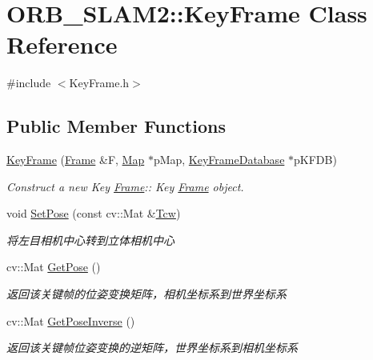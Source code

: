 \hypertarget{class_o_r_b___s_l_a_m2_1_1_key_frame}{}\section{O\+R\+B\+\_\+\+S\+L\+A\+M2\+:\+:Key\+Frame Class Reference}
\label{class_o_r_b___s_l_a_m2_1_1_key_frame}


{\ttfamily \#include $<$Key\+Frame.\+h$>$}

\subsection*{Public Member Functions}
\begin{DoxyCompactItemize}
\item 
\mbox{\hyperlink{class_o_r_b___s_l_a_m2_1_1_key_frame_a6b2fd06ed5e4a8f9546c515db554bcb6}{Key\+Frame}} (\mbox{\hyperlink{class_o_r_b___s_l_a_m2_1_1_frame}{Frame}} \&F, \mbox{\hyperlink{class_o_r_b___s_l_a_m2_1_1_map}{Map}} $\ast$p\+Map, \mbox{\hyperlink{class_o_r_b___s_l_a_m2_1_1_key_frame_database}{Key\+Frame\+Database}} $\ast$p\+K\+F\+DB)
\begin{DoxyCompactList}\small\item\em Construct a new Key \mbox{\hyperlink{class_o_r_b___s_l_a_m2_1_1_frame}{Frame}}\+:\+: Key \mbox{\hyperlink{class_o_r_b___s_l_a_m2_1_1_frame}{Frame}} object. \end{DoxyCompactList}\item 
void \mbox{\hyperlink{class_o_r_b___s_l_a_m2_1_1_key_frame_aa799150fa33f3b9a404226454b96c95a}{Set\+Pose}} (const cv\+::\+Mat \&\mbox{\hyperlink{class_o_r_b___s_l_a_m2_1_1_key_frame_a8dc31ef9a08d34ecb196f3e58a2c09b9}{Tcw}})
\begin{DoxyCompactList}\small\item\em 将左目相机中心转到立体相机中心 \end{DoxyCompactList}\item 
cv\+::\+Mat \mbox{\hyperlink{class_o_r_b___s_l_a_m2_1_1_key_frame_a49b5e212c1335cf585eaf6bbc4fed85c}{Get\+Pose}} ()
\begin{DoxyCompactList}\small\item\em 返回该关键帧的位姿变换矩阵，相机坐标系到世界坐标系 \end{DoxyCompactList}\item 
cv\+::\+Mat \mbox{\hyperlink{class_o_r_b___s_l_a_m2_1_1_key_frame_a03be061f5dac65d360d65c6e8a63532f}{Get\+Pose\+Inverse}} ()
\begin{DoxyCompactList}\small\item\em 返回该关键帧位姿变换的逆矩阵，世界坐标系到相机坐标系 \end{DoxyCompactList}\item 

\end{DoxyCompactItemize}
